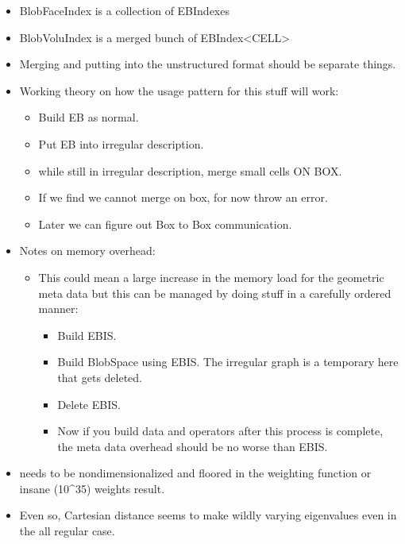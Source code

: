 \begin{itemize}
\item BlobFaceIndex is a collection of EBIndexes
\item BlobVoluIndex is a merged bunch of EBIndex<CELL>
\item Merging and putting into the unstructured format should be
  separate things.
\item Working theory on how the usage pattern for this stuff will work:
  \begin{itemize}
  \item Build EB as normal.
  \item Put EB into irregular description.
    \item while still in irregular description, merge small cells ON
      BOX.
    \item  If we find we cannot merge on box, for now throw an error.
    \item  Later we can figure out Box to Box communication.
  \end{itemize}
\item Notes on memory overhead:
  \begin{itemize}
    \item This could mean  a large increase in the memory load for the
      geometric meta data but this can be managed by doing stuff in a
      carefully ordered manner:
      \begin{itemize}
      \item Build EBIS.
      \item Build BlobSpace using EBIS.  The irregular graph is a
        temporary here that gets deleted.
      \item Delete EBIS.
      \item Now if you build data and operators after this process is
        complete, the meta data overhead should be no worse than EBIS.
      \end{itemize}
      
  \end{itemize}

\end{itemize}


\begin{itemize}
\item \xbar needs to be nondimensionalized and floored in the weighting function or
  insane (10^35) weights result.
\item Even so, Cartesian distance seems to make wildly varying
  eigenvalues even in the all regular case.
  
\end{itemize}  
